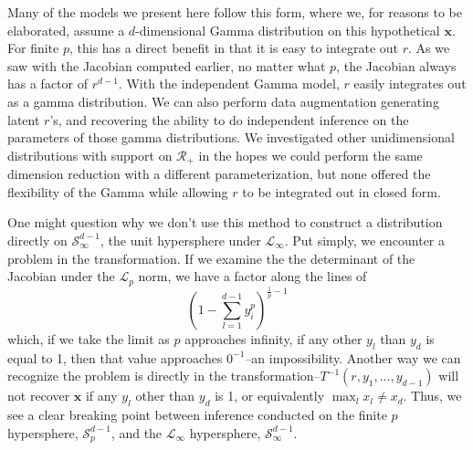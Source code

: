 Many of the models we present here follow this form, where we, for reasons to be elaborated, assume
  a $d$-dimensional Gamma distribution on this hypothetical $\bm{x}$. For finite $p$, this has a
  direct benefit in that it is easy to integrate out $r$.  As we saw with the Jacobian computed
  earlier, no matter what $p$, the Jacobian always has a factor of $r^{d-1}$.  With the independent
  Gamma model, $r$ easily integrates out as a gamma distribution.  We can also perform data
  augmentation generating latent $r$'s, and recovering the ability to do independent inference on
  the parameters of those gamma distributions.  We investigated other unidimensional distributions
  with support on $\mathcal{R}_+$ in the hopes we could perform the same dimension reduction with a
  different parameterization, but none offered the flexibility of the Gamma while allowing $r$ to be
  integrated out in closed form.

One might question why we don't use this method to construct a distribution directly on
  $\mathcal{S}_{\infty}^{d-1}$, the unit hypersphere under $\mathcal{L}_{\infty}$.  Put simply, we
  encounter a problem in the transformation.  If we examine the the determinant of the Jacobian
  under the $\mathcal{L}_{p}$ norm, we have a factor along the lines of
  \begin{equation*}
    \left(1 - \sum_{l = 1}^{d-1}y_i^p\right)^{\frac{1}{p} - 1}
  \end{equation*}
  which, if we take the limit as $p$ approaches infinity, if any other $y_l$ than $y_d$ is equal to
  1, then that value approaches $0^{-1}$--an impossibility.  Another way we can recognize the problem
  is directly in the transformation--$T^{-1}(r,y_1,\ldots,y_{d-1})$ will not recover $\bm{x}$ if
  any $y_l$ other than $y_d$ is 1, or equivalently $\max_l x_l\neq x_d$.  Thus, we see a clear
  breaking point between inference conducted on the finite $p$ hypersphere, $\mathcal{S}_{p}^{d-1}$,
  and the $\mathcal{L}_{\infty}$ hypersphere, $\mathcal{S}_{\infty}^{d-1}$.

